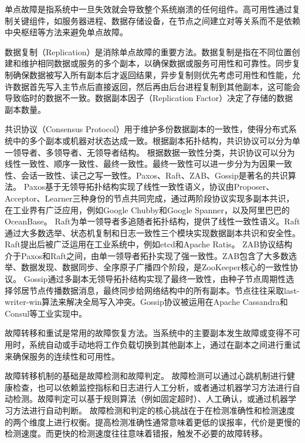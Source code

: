 单点故障是指系统中一旦失效就会导致整个系统崩溃的任何组件。高可用性通过复制关键组件，如服务器进程、数据存储设备，在节点之间建立对等关系而不是依赖中央枢纽等方法来避免单点故障。

数据复制（Replication）是消除单点故障的重要方法。数据复制是指在不同位置创建和维护相同数据或服务的多个副本，以确保数据或服务可用性和可靠性。同步复制确保数据被写入所有副本后才返回结果，异步复制则优先考虑可用性和性能，允许数据首先写入主节点后直接返回，然后再由后台进程复制到其他副本，这可能会导致临时的数据不一致。数据副本因子（Replication Factor）决定了存储的数据副本数量。


共识协议（Consensus Protocol）用于维护多份数据副本的一致性，使得分布式系统中的多个副本或机器对状态达成一致。根据副本拓扑结构，共识协议可以分为单一领导者、多领导者、无领导者结构。
根据数据一致性分类，共识协议可以分为线性一致性\cite{herlihy1990linearizability}、顺序一致性\cite{attiya1994sequential}、最终一致性\cite{bailis2013eventual}。最终一致性可以进一步分为为因果一致性\cite{lloyd2011cops}、会话一致性\cite{mortazavi2018session}、读己之写一致性\cite{nishtala2013memcached}。Paxos、Raft、ZAB、Gossip是著名的共识算法。
Paxos\cite{lamport2001paxos}基于无领导拓扑结构实现了线性一致性语义，协议由Proposer、Acceptor、Learner三种身份的节点共同完成，通过两阶段协议实现多副本共识，在工业界有广泛应用，例如Google Chubby\cite{burrows2006chubby}和Google Spanner\cite{corbett2013spanner}，以及阿里巴巴的OceanBase\cite{zhen2014OceanBase}。
Raft\cite{ongaro2014raft}为单一领导者多追随者拓扑结构，提供了线性一致性语义。Raft通过大多数选举、状态机复制和日志一致性三个模块实现数据副本共识和安全性。Raft提出后被广泛运用在工业系统中，例如etcd\cite{etcd}和Apache Ratis\cite{ratis}。
ZAB\cite{junqueira2011zab}协议结构介于Paxos和Raft之间，由单一领导者拓扑实现了强一致性。ZAB包含了大多数选举、数据发现、数据同步、全序原子广播四个阶段，是ZooKeeper\cite{hunt2010zookeeper}核心的一致性协议。
Gossip\cite{demers1987gossip}通过多副本无领导拓扑结构实现了最终一致性，由种子节点周期性选择邻居节点传播数据消息，最终同步给网络结构中的所有副本。节点往往采取last-writer-win算法来解决全局写入冲突。Gossip协议被运用在Apache Cassandra\cite{lakshman2010cassandra}和Consul\cite{mishra1993consul}等工业实现中。


故障转移和重试是常用的故障恢复方法。当系统中的主要副本发生故障或变得不可用时，系统自动或手动地将工作负载切换到其他副本上，通过在副本之间进行重试来确保服务的连续性和可用性。

故障转移机制的基础是故障检测和故障判定。
故障检测可以通过心跳机制进行健康检查，也可以依赖监控指标和日志进行人工分析，或者通过机器学习方法进行自动检测。故障判定可以基于规则算法（例如固定超时）、人工确认，或通过机器学习方法进行自动判断。
故障检测和判定的核心挑战在于在检测准确性和检测速度的两个维度上进行权衡。提高检测准确性通常意味着更低的误报率，代价是更慢的检测速度。而更快的检测速度往往意味着错报，触发不必要的故障转移。

